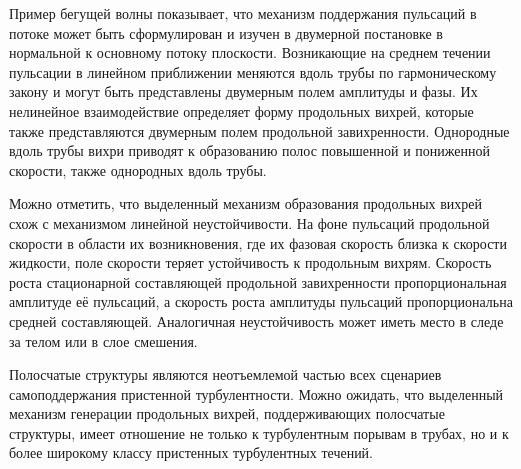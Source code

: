 Пример бегущей волны показывает, что механизм поддержания пульсаций в потоке может быть сформулирован и изучен в двумерной постановке в нормальной к основному потоку плоскости. Возникающие на среднем течении пульсации в линейном приближении меняются вдоль трубы по гармоническому закону и могут быть представлены двумерным полем амплитуды и фазы. Их нелинейное взаимодействие определяет форму продольных вихрей, которые также представляются двумерным полем продольной завихренности. Однородные вдоль трубы вихри приводят к образованию полос повышенной и пониженной скорости, также однородных вдоль трубы. 

Можно отметить, что выделенный механизм образования продольных вихрей схож с механизмом линейной неустойчивости. На фоне пульсаций продольной скорости в области их возникновения, где их фазовая скорость близка к скорости жидкости, поле скорости теряет устойчивость к продольным вихрям. Скорость роста стационарной составляющей продольной завихренности пропорциональная амплитуде её пульсаций, а скорость роста амплитуды пульсаций пропорциональна средней составляющей. Аналогичная неустойчивость может иметь место в следе за телом или в слое смешения. 

Полосчатые структуры являются неотъемлемой частью всех сценариев самоподдержания пристенной турбулентности. Можно ожидать, что выделенный механизм генерации продольных вихрей, поддерживающих полосчатые структуры, имеет отношение не только к турбулентным порывам в трубах, но и к более широкому классу пристенных турбулентных течений. 





